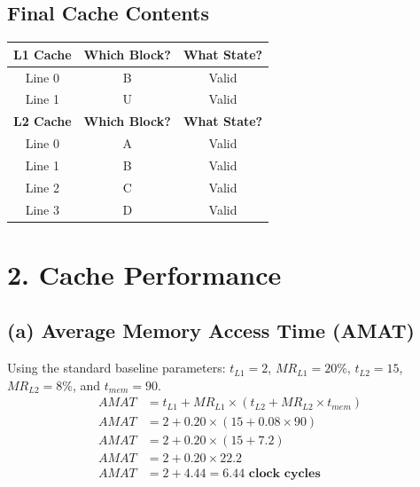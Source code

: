 \documentclass{article}
\begin{document}
\subsection{Final Cache Contents}
\begin{table}[H]
	\centering
	\renewcommand{\arraystretch}{1.3}
	\begin{tabular}{|c|c|c|}
		\hline
		\textbf{L1 Cache} & \textbf{Which Block?} & \textbf{What State?} \\
		\hline
		Line 0            & B                     & Valid                \\
		\hline
		Line 1            & U                     & Valid                \\
		\hline
		\textbf{L2 Cache} & \textbf{Which Block?} & \textbf{What State?} \\
		\hline
		Line 0            & A                     & Valid                \\
		\hline
		Line 1            & B                     & Valid                \\
		\hline
		Line 2            & C                     & Valid                \\
		\hline
		Line 3            & D                     & Valid                \\
		\hline
	\end{tabular}
\end{table}

\pagebreak

\section{2. Cache Performance}

\subsection{(a) Average Memory Access Time (AMAT)}
Using the standard baseline parameters: $t_{L1} = 2$, $MR_{L1} = 20\%$, $t_{L2} = 15$, $MR_{L2} = 8\%$, and $t_{mem} = 90$.
\begin{align*}
	AMAT & = t_{L1} + MR_{L1} \times (t_{L2} + MR_{L2} \times t_{mem}) \\
	AMAT & = 2 + 0.20 \times (15 + 0.08 \times 90)                     \\
	AMAT & = 2 + 0.20 \times (15 + 7.2)                                \\
	AMAT & = 2 + 0.20 \times 22.2                                      \\
	AMAT & = 2 + 4.44 = \mathbf{6.44 \text{ clock cycles}}
\end{align*}
\end{document}
